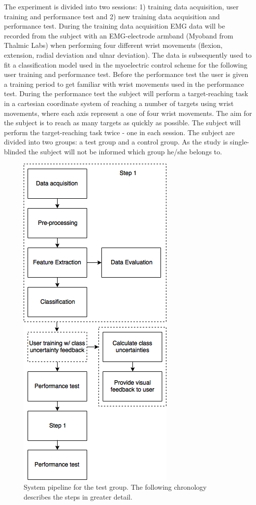 The experiment is divided into two sessions: 1) training data acquisition, user training and performance test and 2) new training data acquisition and performance test. During the training data acquisition EMG data will be recorded from the subject with an EMG-electrode armband (Myoband from Thalmic Labs) when performing four different wrist movements (flexion, extension, radial deviation and ulnar deviation). The data is subsequently used to fit a classification model used in the myoelectric control scheme for the following user training and performance test. Before the performance test the user is given a training period to get familiar with wrist movements used in the performance test. During the performance test the subject will perform a target-reaching task in a cartesian coordinate system of reaching a number of targets using wrist movements, where each axis represent a one of four wrist movements. The aim for the subject is to reach as many targets as quickly as possible. The subject will perform the target-reaching task twice - one in each session. The subject are divided into two groups: a test group and a control group. As the study is single-blinded the subject will not be informed which group he/she belongs to.

\begin{figure}[H]                                         
	\includegraphics[width=.4\textwidth]{figures/sStatusSeminar/systemPepeLineTG}  
	\caption{System pipeline for the test group. The following chronology describes the steps in greater detail.}
	\label{fig:sysPipeTG} 
\end{figure} 


